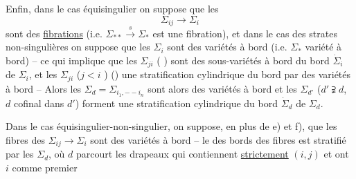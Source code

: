 Enfin, dans le cas équisingulier on suppose que les
\[
\Sigma_{ij}\longrightarrow\Sigma_i
\]
sont des \uline{fibrations} (i.e. $\Sigma_{**}\xrightarrow{s}\Sigma_*$ est une fibration), et dans le cas des strates  non-singulières on suppose que les $\Sigma_i$ sont des variétés à bord (i.e. $\Sigma_*$ variété à bord) -- ce qui implique que les $\Sigma_{ji}$ ( ) sont des sous-variétés à bord du  bord $\dot\Sigma_i$ de $\Sigma_i$, et les $\Sigma_{ji}$ ($j<i$ )  () une stratification cylindrique du \deleted{$\unsure{\Sigma_*}$} bord par des variétés à bord -- Alors les $\Sigma_d=\Sigma_{i_1,--i_n}$ sont alors des variétés à bord  et les $\Sigma_{d'}$ ($d'\supsetneqq d$, $d$ cofinal dans $d'$)  forment une stratification cylindrique du bord  $\dot\Sigma_d$ de $\Sigma_d$.

Dans le cas équisingulier-non-singulier, on suppose, en plus de e) et f), que les fibres des  $\Sigma_{ij}\longrightarrow\Sigma_i$ sont des variétés à bord -- le   des bords des fibres est  stratifié par les $\Sigma_d$, où $d$  parcourt les drapeaux qui contiennent \uline{strictement} \deleted{$\unsure{\Sigma}$} $(i,j)$ et ont $i$ comme premier
